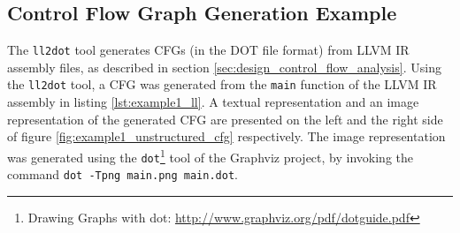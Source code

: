 
\subsection{Control Flow Graph Generation Example}
\label{app:control_flow_graph_generation_example}

The \texttt{ll2dot} tool generates CFGs (in the DOT file format) from LLVM IR assembly files, as described in section \ref{sec:design_control_flow_analysis}. Using the \texttt{ll2dot} tool, a CFG was generated from the \texttt{main} function of the LLVM IR assembly in listing \ref{lst:example1_ll}. A textual representation and an image representation of the generated CFG are presented on the left and the right side of figure \ref{fig:example1_unstructured_cfg} respectively. The image representation was generated using the \texttt{dot}\footnote{Drawing Graphs with dot: \url{http://www.graphviz.org/pdf/dotguide.pdf}} tool of the Graphviz project, by invoking the command \texttt{dot -Tpng main.png main.dot}.

